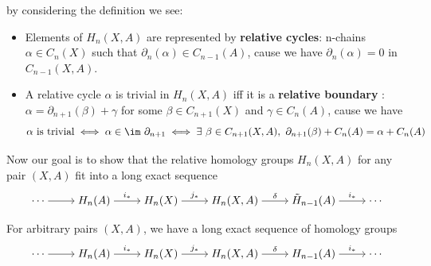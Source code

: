 by considering the definition we see:
\begin{itemize}
	\item Elements of $H_n(X,A)$ are represented by \textbf{relative cycles}: n-chains $\alpha\in C_n(X)$ such that $\partial_n(\alpha)\in C_{n-1}(A)$, cause we have $\partial_n(\alpha)=0$ in $C_{n-1}(X,A)$.
	\item A relative cycle $\alpha$ is trivial in $H_n(X,A)$ iff it is a \textbf{relative boundary} : $\alpha=\partial_{n+1}(\beta)+\gamma$ for some $\beta\in C_{n+1}(X)$ and $\gamma\in C_n(A)$, cause we have
	\[\alpha\ \text{is trivial}\iff \alpha\in \im\ \partial_{n+1}\iff \exists\ \beta\in C_{n+1}(X,A),\ \partial_{n+1}(\beta)+C_{n}(A)=\alpha+C_n(A)\]
\end{itemize}
Now our goal is to show that the relative homology groups $H_n(X,A)$ for any pair $(X,A)$ fit into a long exact sequence 
\[
\begin{tikzcd}[cramped]
\cdots \ar[r," "] &H_n(A)\ar[r,"i_*"] &H_n(X) \ar[r,"j_*"] &H_n(X,A) \ar[r,"\delta"] &\tilde{H}_{n-1}(A) \ar[r,"i_*"]&\cdots
\end{tikzcd}
\]
\begin{theorem}
	For arbitrary pairs $(X,A)$, we have a long exact sequence of homology groups
	\[
	\begin{tikzcd}[cramped]
	\cdots \ar[r,] &H_n(A)\ar[r,"i_*"] &H_n(X) \ar[r,"j_*"] &H_n(X,A) \ar[r,"\delta"] &H_{n-1}(A) \ar[r,"i_*"]&\cdots
	\end{tikzcd}
	\]
\end{theorem}
